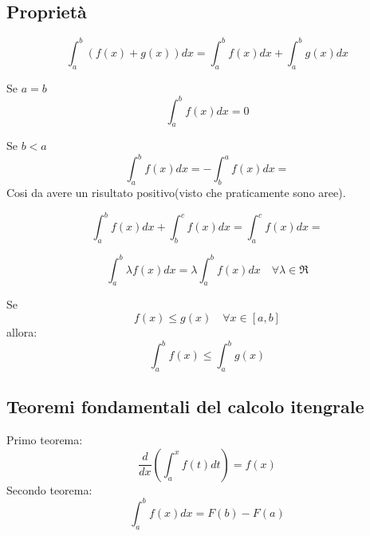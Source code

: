 \documentclass{article}
\begin{document}
    \subsection{Proprietà}

    \setcounter{equation}{0}
    \begin{equation}
        \int_a^b (f(x) + g(x))dx = \int_a^b f(x)dx + \int_a^b g(x)dx
    \end{equation}


    

    Se $a = b$
    \begin{equation}
        \int_a^b f(x)dx = 0
    \end{equation}



    Se $b < a$
    \begin{equation}
        \int_a^b f(x)dx = - \int_b^a f(x)dx =
    \end{equation}
    Cosi da avere un risultato positivo(visto che praticamente sono aree).



    \begin{equation}
        \int_a^b f(x)dx + \int_b^c f(x)dx = \int_a^c f(x)dx =
    \end{equation}


    \begin{equation}
        \int_a^b \lambda f(x)dx = \lambda \int_a^b f(x)dx \quad \forall \lambda \in \Re
    \end{equation}




    Se 
    \begin{equation*}
        f(x) \leq g(x) \quad \forall x \in [a, b]
    \end{equation*}
    allora:
    \begin{equation}
        \int_a^b f(x) \leq \int_a^b g(x)
    \end{equation}


    \subsection{Teoremi fondamentali del calcolo itengrale}
    \setcounter{equation}{0}

    Primo teorema:
    \begin{equation}
        \frac{d}{dx}(\int_a^x f(t)dt) = f(x)
    \end{equation}
    Secondo teorema:
    \begin{equation}
        \int_a^b f(x)dx = F(b) - F(a)
    \end{equation}
\end{document}
